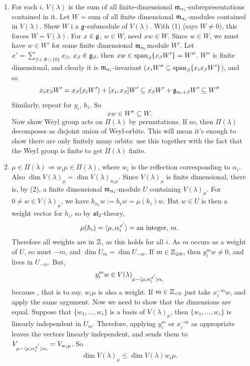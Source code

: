 \documentclass{article}
\begin{document}
\begin{enumerate}
\begin{enumerate}
    \item[2.] For each $i$, $V(\lambda)$ is the sum of all finite-dimensional $\mathfrak{m}_{\alpha_{i}}$-subrepresentations contained in it. \gap Let $W$ = sum of all finite dimensional $\mathfrak{m}_{\alpha_{i}}$-modules contained in $V(\lambda)$. Show $W$ i a $\mathfrak{g}$-submodule of $V(\lambda)$. With (1) (says $W \neq 0$), this forces $W = V(\lambda)$. For $x \in \mathfrak{g}$, $w \in W$, need $xw \in W$. Since $w \in W$, we must have $ w \in W'$ for some finite dimensional $\mathfrak{m}_{\alpha_{i}}$module $W'$.
    Let $x' = \sum_{\beta \in \Phi \cup \{0\}} x_{\beta}$, $x_{\beta} \in \mathfrak{g}_{\beta}$, then $xw \in \operatorname{span}_{\beta}\{x_{\beta} W'\} = W''$. $W''$ is finite dimensional, and clearly it is $\mathfrak{m}_{\alpha_{i}}$-invariant ($x_{i}W'' \subseteq \operatorname{span}_{\beta}\{x_{i}x_{\beta}W'\}$), and so \[x_{i}x_{\beta}W' = x_{\beta}(x_{i}W') + [x_{i},x_{\beta}]W' \subseteq x_{\beta} W' + \mathfrak{g}_{\alpha_{i} + \beta} W' \subseteq W'' \]
    Similarly, repeat for $y_{i}$, $h_{i}$. So \[ xw \in W'' \subseteq W.\] Now show Weyl group acts on $\Pi (\lambda)$ by permutations. If so, then $\Pi (\lambda)$ decomposes as disjoint union of Weyl-orbits. This will mean it's enough to show there are only finitely many orbits: use this together with the fact that the Weyl group is finite to get $\Pi (\lambda)$ finite. 
    \item[3.] $\mu \in \Pi (\lambda) \Rightarrow w_{i} \mu \in \Pi(\lambda)$, where $w_{i}$ is the reflection corresponding to $\alpha_{i}$.
    Also $\dim V(\lambda)_{\mu} = \dim V(\lambda)_{w_{i}\mu}$. Since $V(\lambda)_\mu$ is finite dimensional, there is, by (2), a finite dimensional $\mathfrak{m}_{\alpha_{i}}$-module $U$ containing $V(\lambda)_\mu$. \gap For \newlec $0 \neq w \in V(\lambda)_\mu$, we have $h_{\alpha_{i}}w := h_{i}w = \mu(h_{i})w$. But $w \in U$ is then a weight vector for $h_{i}$, so by $\mathfrak{sl}_{2}$-theory, \[\mu(h_{i}) = \langle \mu, \alpha_{i}^{\checked} \rangle = \text{an integer, $m$}.\] Therefore all weights are in $\mathbb{Z}$, as this holds for all $i$. As $m$ occurs as a weight of $U$, so must $-m$, and $\dim U_{m} = \dim U_{-m}$. \gap If $m \in \mathbb{Z}_{\geqslant 0}$, then $y_{i}^{m}w \neq 0$, and lives in $U_{-m}$. But, \[y_{i}^{m}w \in V(\lambda)_{\mu - \langle \mu, \alpha_{i}^{\checked} \rangle \alpha_{i}}\]
    because , that is to say, $w_{i}\mu$ is also a weight. If $m \in \mathbb{Z}_{<0}$ just take $x_{i}^{-m}w$, and apply the same argument. \gap Now we need to show that the dimensions are equal. Suppose that $\{w_{1}, \dots, w_{r}\}$ is a basis of $V(\lambda)_{\mu}$, then $\{w_{1}, \dots, w_{r}\}$ is linearly independent in $U_{m}$. Therefore, applying $y_{i}^{m}$ or $x_{i}^{-m}$ as appropriate leaves the vectors linearly independent, and sends them to $V_{\mu - \langle \mu, \alpha_{i}^{\checked}\rangle \alpha_{i}} = V_{w_{i}\mu}$. So \[ \dim V(\lambda)_\mu \leq \dim V(\lambda) w_{i}\mu. \]

\end{enumerate}
\end{enumerate}
\end{document}
